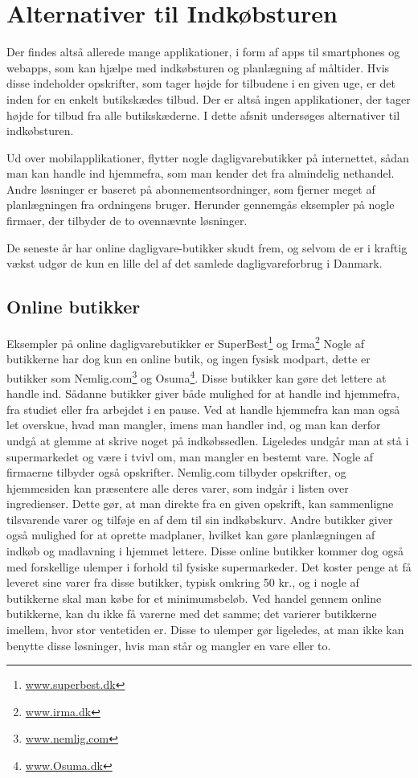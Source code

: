 \section{Alternativer til Indkøbsturen}
Der findes altså allerede mange applikationer, i form af apps til smartphones og webapps, som kan hjælpe med indkøbsturen og planlægning af måltider. 
Hvis disse indeholder opskrifter, som tager højde for tilbudene i en given uge, er det inden for en enkelt butikskædes tilbud. 
Der er altså ingen applikationer, der tager højde for tilbud fra alle butikskæderne. 
I dette afsnit undersøges alternativer til indkøbsturen.

Ud over mobilapplikationer, flytter nogle dagligvarebutikker på internettet, sådan man kan handle ind hjemmefra, som man kender det fra almindelig nethandel.
Andre løsninger er baseret på abonnementsordninger, som fjerner meget af planlægningen fra ordningens bruger.
Herunder gennemgås eksempler på nogle firmaer, der tilbyder de to ovennævnte løsninger.

De seneste år har online dagligvare-butikker skudt frem, og selvom de er i kraftig vækst udgør de kun en lille del af det samlede dagligvareforbrug i Danmark\citep{SOTA_MP1}.

\subsection{Online butikker}
Eksempler på online dagligvarebutikker er SuperBest\footnote{\underline{www.superbest.dk}} og Irma\footnote{\underline{www.irma.dk}}
Nogle af butikkerne har dog kun en online butik, og ingen fysisk modpart, dette er butikker som Nemlig.com\footnote{\underline{www.nemlig.com}} og Osuma\footnote{\underline{www.Osuma.dk}}.
Disse butikker kan gøre det lettere at handle ind.
Sådanne butikker giver både mulighed for at handle ind hjemmefra, fra studiet eller fra arbejdet i en pause.
Ved at handle hjemmefra kan man også let overskue, hvad man mangler, imens man handler ind, og man kan derfor undgå at glemme at skrive noget på indkøbssedlen.
Ligeledes undgår man at stå i supermarkedet og være i tvivl om, man mangler en bestemt vare.
Nogle af firmaerne tilbyder også opskrifter.
Nemlig.com tilbyder opskrifter, og hjemmesiden kan præsentere alle deres varer, som indgår i listen over ingredienser.
Dette gør, at man direkte fra en given opskrift, kan sammenligne tilsvarende varer og tilføje en af dem til sin indkøbskurv.
Andre butikker giver også mulighed for at oprette madplaner, hvilket kan gøre planlægningen af indkøb og madlavning i hjemmet lettere.
Disse online butikker kommer dog også med forskellige ulemper i forhold til fysiske supermarkeder.
Det koster penge at få leveret sine varer fra disse butikker, typisk omkring 50 kr., og i nogle af butikkerne skal man købe for et minimumsbeløb.
Ved handel gennem online butikkerne, kan du ikke få varerne med det samme; det varierer butikkerne imellem, hvor stor ventetiden er.
Disse to ulemper gør ligeledes, at man ikke kan benytte disse løsninger, hvis man står og mangler en vare eller to.

